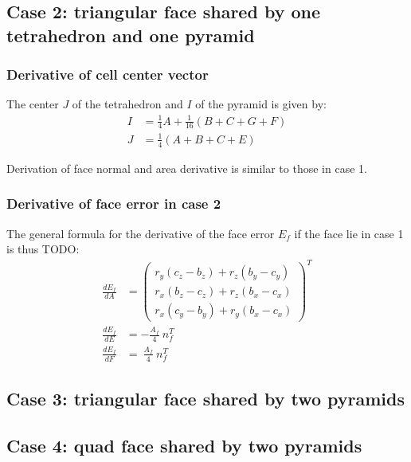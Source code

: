 \documentclass[11pt]{article}
\begin{document}
\subsection{Case 2: triangular face shared by one tetrahedron and one pyramid}

\subsubsection{Derivative of cell center vector}

The center $J$ of the tetrahedron and $I$ of the pyramid is given by:
\begin{subequations}
\begin{align}
I &= \frac{1}{4} A + \frac{1}{16} (B + C + G + F) \\
J &= \frac{1}{4} (A + B + C + E)
\end{align}
\end{subequations} 

Derivation of face normal and area derivative is similar to those in case 1.

\subsubsection{Derivative of face error in case 2}
The general formula for the derivative of the face error $E_f$ if the face lie in case 1 is thus TODO:
\begin{subequations}
\begin{align}
\frac{d E_f}{d A} &= 
\begin{pmatrix}
r_y(c_z-b_z) + r_z(b_y-c_y)\\
r_x(b_z-c_z) + r_z(b_x-c_x) \\
r_x(c_y-b_y) + r_y(b_x-c_x)
\end{pmatrix}^T
 \\
\frac{d E_f}{d E} &= - \frac{A_f }{4}\ n_f^T \\
\frac{d E_f}{d F} &= \ \frac{A_f }{4}\ n_f^T
\end{align}
\end{subequations} 


\subsection{Case 3: triangular face shared by two pyramids}




\subsection{Case 4: quad face shared by two pyramids}
\end{document}
